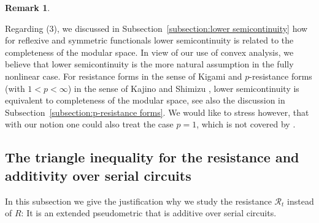 \documentclass[a4paper,11pt,reqno]{amsart}
\theoremstyle{definition}
\newtheorem{remark}[lemma]{Remark}
\numberwithin{equation}{section}
\newcommand{\cR}{{\mathcal R}}
\newcommand{\1}{\mathds{1}}
\begin{document}
\begin{remark}
\begin{enumerate}[(a)]
Regarding (3), we discussed in Subsection~\ref{subsection:lower semicontinuity} how for reflexive and symmetric functionals lower semicontinuity is related to the completeness of the modular space. In view of our use of convex analysis, we believe that lower semicontinuity is the more natural assumption in the fully nonlinear case. For resistance forms in the sense of Kigami \cite{Kig03} and $p$-resistance forms (with $1 < p < \infty$) in the sense of Kajino and Shimizu \cite{KS25}, lower semicontinuity is equivalent to completeness of the modular space, see also the discussion in Subsection~\ref{subsection:p-resistance forms}. We would like to stress however, that with our notion one could also treat the case $p=1$, which is not covered by \cite{KS25}.
\end{enumerate}
 
\end{remark}








 
 

 \subsection{The triangle inequality for the resistance and additivity over serial circuits}
 
 In this subsection we give the justification why we study the resistance $\cR_t$ instead of $R$: It is an extended pseudometric that is additive  over serial circuits.  
 
\end{document}
